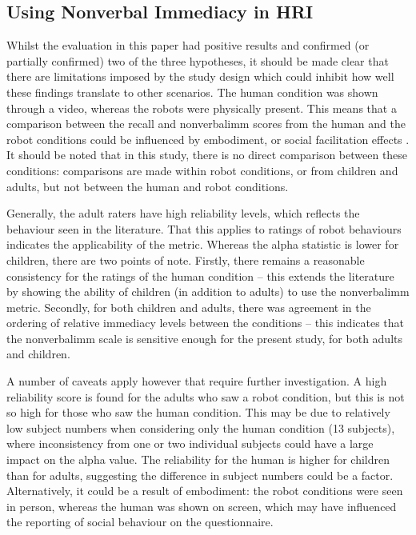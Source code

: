 \subsection{Using Nonverbal Immediacy in HRI}\label{sec:disc-nvi}
Whilst the evaluation in this paper had positive results and confirmed (or partially confirmed) two of the three hypotheses, it should be made clear that there are limitations imposed by the study design which could inhibit how well these findings translate to other scenarios. The human condition was shown through a video, whereas the robots were physically present. This means that a comparison between the recall and \gls{nonverbalimm} scores from the human and the robot conditions could be influenced by embodiment, or social facilitation effects \citep{zajonc1965social}. It should be noted that in this study, there is no direct comparison between these conditions: comparisons are made within robot conditions, or from children and adults, but not between the human and robot conditions. 

Generally, the adult raters have high reliability levels, which reflects the behaviour seen in the literature. That this applies to ratings of robot behaviours indicates the applicability of the metric. Whereas the alpha statistic is lower for children, there are two points of note. Firstly, there remains a reasonable consistency for the ratings of the human condition -- this extends the literature by showing the ability of children (in addition to adults) to use the \gls{nonverbalimm} metric. Secondly, for both children and adults, there was agreement in the ordering of relative \gls{immediacy} levels between the conditions -- this indicates that the \gls{nonverbalimm} scale is sensitive enough for the present study, for both adults and children.

A number of caveats apply however that require further investigation. A high reliability score is found for the adults who saw a robot condition, but this is not so high for those who saw the human condition. This may be due to relatively low subject numbers when considering only the human condition (13 subjects), where inconsistency from one or two individual subjects could have a large impact on the alpha value. The reliability for the human is higher for children than for adults, suggesting the difference in subject numbers could be a factor. Alternatively, it could be a result of embodiment: the robot conditions were seen in person, whereas the human was shown on screen, which may have influenced the reporting of social behaviour on the questionnaire.


